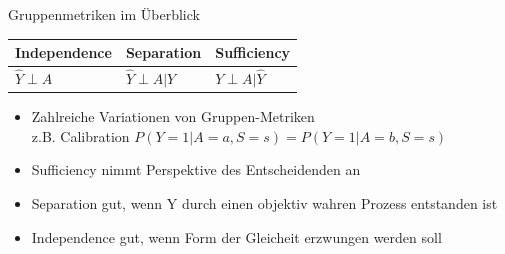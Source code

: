 \documentclass[aspectratio=169]{beamer}
\begin{document}


\begin{frame}{Gruppenmetriken im Überblick}
	\begin{table}
		\begin{tabular}{lll}
			\toprule
			Independence & Separation & {Sufficiency} \\
			\midrule
			$\hat{Y} \perp A$ & $\hat{Y} \perp A | Y$ & {$Y \perp A | \hat{Y}$}\\
			\bottomrule
		\end{tabular}
	\end{table}
	\begin{itemize}
		\item<2-> Zahlreiche Variationen von Gruppen-Metriken \\ z.B. Calibration $P(Y = 1 | A = a, S = s) = P(Y = 1 | A = b, S = s)$
		\item<3-> Sufficiency nimmt Perspektive des Entscheidenden an \cite{castelnovo2022}
		\item<4-> Separation gut, wenn Y durch einen objektiv wahren Prozess entstanden ist \cite{castelnovo2022}
		\item<5-> Independence gut, wenn Form der Gleicheit erzwungen werden soll \cite{castelnovo2022}
	\end{itemize}
	\vspace*{0.5cm}
\end{frame}
\end{document}
